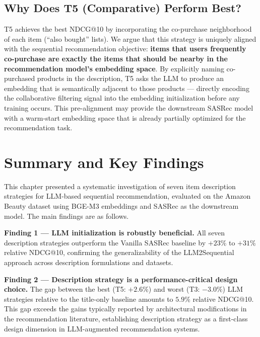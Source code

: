 \documentclass[12pt,a4paper]{report}
\begin{document}
\subsection{Why Does T5 (Comparative) Perform Best?}

T5 achieves the best NDCG@10 by incorporating the
co-purchase neighborhood of each item (``also bought''
lists). We argue that this strategy is uniquely aligned
with the sequential recommendation objective: \textbf{items
that users frequently co-purchase are exactly the items
that should be nearby in the recommendation model's
embedding space}. By explicitly naming co-purchased
products in the description, T5 asks the LLM to produce
an embedding that is semantically adjacent to those products
--- directly encoding the collaborative filtering signal
into the embedding initialization before any training
occurs. This pre-alignment may provide the downstream
SASRec model with a warm-start embedding space that is
already partially optimized for the recommendation task.


\section{Summary and Key Findings}
\label{sec:promptcraft_summary}

This chapter presented a systematic investigation of seven
item description strategies for LLM-based sequential
recommendation, evaluated on the Amazon Beauty dataset using
BGE-M3 embeddings and SASRec as the downstream model.
The main findings are as follows.

\medskip
\noindent\textbf{Finding 1 --- LLM initialization is robustly beneficial.}
All seven description strategies outperform the Vanilla
SASRec baseline by $+23\%$ to $+31\%$ relative NDCG@10,
confirming the generalizability of the LLM2Sequential
approach across description formulations and datasets.

\medskip
\noindent\textbf{Finding 2 --- Description strategy is a
performance-critical design choice.}
The gap between the best (T5: $+2.6\%$) and worst (T3: $-3.0\%$)
LLM strategies relative to the title-only baseline
amounts to $5.9\%$ relative NDCG@10. This gap exceeds the
gains typically reported by architectural modifications in
the recommendation literature, establishing description
strategy as a first-class design dimension in LLM-augmented
recommendation systems.
\end{document}
